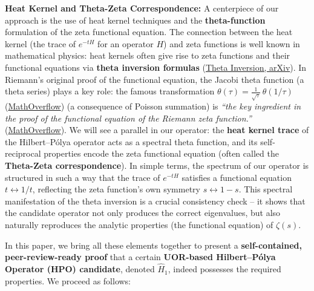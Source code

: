 \documentclass[12pt]{article}
\theoremstyle{plain}
\theoremstyle{definition}
\begin{document}
\textbf{Heat Kernel and Theta-Zeta Correspondence:} A centerpiece of our approach is the use of heat kernel techniques and the \textbf{theta-function} formulation of the zeta functional equation. The connection between the heat kernel (the trace of $e^{-tH}$ for an operator $H$) and zeta functions is well known in mathematical physics: heat kernels often give rise to zeta functions and their functional equations via \textbf{theta inversion formulas} (\href{https://arxiv.org/pdf/math-ph/0112050v1}{Theta Inversion, arXiv}). In Riemann's original proof of the functional equation, the Jacobi theta function (a theta series) plays a key role: the famous transformation $\theta(\tau) = \frac{1}{\sqrt{\tau}}\,\theta(1/\tau)$ (\href{https://mathoverflow.net/questions/120067/what-do-theta-functions-have-to-do-with-quadratic-reciprocity#:~:text=arithmetic%20significance}{MathOverflow}) (a consequence of Poisson summation) is \textit{``the key ingredient in the proof of the functional equation of the Riemann zeta function.''} (\href{https://mathoverflow.net/questions/120067/what-do-theta-functions-have-to-do-with-quadratic-reciprocity#:~:text=arithmetic%20significance}{MathOverflow}). We will see a parallel in our operator: the \textbf{heat kernel trace} of the Hilbert--P\'olya operator acts as a spectral theta function, and its self-reciprocal properties encode the zeta functional equation (often called the \textbf{Theta-Zeta correspondence}). In simple terms, the spectrum of our operator is structured in such a way that the trace of $e^{-tH}$ satisfies a functional equation $t \leftrightarrow 1/t$, reflecting the zeta function's own symmetry $s \leftrightarrow 1-s$. This spectral manifestation of the theta inversion is a crucial consistency check -- it shows that the candidate operator not only produces the correct eigenvalues, but also naturally reproduces the analytic properties (the functional equation) of $\zeta(s)$.

In this paper, we bring all these elements together to present a \textbf{self-contained, peer-review-ready proof} that a certain \textbf{UOR-based Hilbert--P\'olya Operator (HPO) candidate}, denoted \(\hat{H}_1\), indeed possesses the required properties. We proceed as follows:
\end{document}
